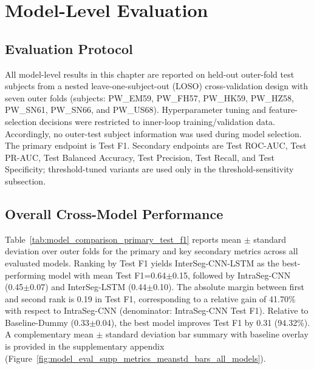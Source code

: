 \section{Model-Level Evaluation}
\label{sec:model_level_evaluation}

\setcounter{topnumber}{3}
\setcounter{bottomnumber}{1}
\setcounter{totalnumber}{4}
\renewcommand{\topfraction}{0.95}
\renewcommand{\bottomfraction}{0.80}
\renewcommand{\textfraction}{0.05}
\renewcommand{\floatpagefraction}{0.75}
\setlength{\textfloatsep}{8pt plus 2pt minus 2pt}
\setlength{\floatsep}{8pt plus 2pt minus 2pt}
\setlength{\intextsep}{8pt plus 2pt minus 2pt}

\subsection{Evaluation Protocol}
\label{sec:evaluation_protocol}
All model-level results in this chapter are reported on held-out outer-fold test subjects from a nested leave-one-subject-out (LOSO) cross-validation design with seven outer folds (subjects: PW\_EM59, PW\_FH57, PW\_HK59, PW\_HZ58, PW\_SN61, PW\_SN66, and PW\_US68). Hyperparameter tuning and feature-selection decisions were restricted to inner-loop training/validation data. Accordingly, no outer-test subject information was used during model selection. The primary endpoint is Test F1. Secondary endpoints are Test ROC-AUC, Test PR-AUC, Test Balanced Accuracy, Test Precision, Test Recall, and Test Specificity; threshold-tuned variants are used only in the threshold-sensitivity subsection.

\subsection{Overall Cross-Model Performance}
\label{sec:overall_cross_model_performance}
Table~\ref{tab:model_comparison_primary_test_f1} reports mean $\pm$ standard deviation over outer folds for the primary and key secondary metrics across all evaluated models. Ranking by Test F1 yields InterSeg-CNN-LSTM as the best-performing model with mean Test F1=0.64$\pm$0.15, followed by IntraSeg-CNN (0.45$\pm$0.07) and InterSeg-LSTM (0.44$\pm$0.10). The absolute margin between first and second rank is 0.19 in Test F1, corresponding to a relative gain of 41.70\% with respect to IntraSeg-CNN (denominator: IntraSeg-CNN Test F1). Relative to Baseline-Dummy (0.33$\pm$0.04), the best model improves Test F1 by 0.31 (94.32\%).
A complementary mean $\pm$ standard deviation bar summary with baseline overlay is provided in the supplementary appendix (Figure~\hyperref[fig:model_eval_supp_metrics_meanstd_bars_all_models]{\ref*{fig:model_eval_supp_metrics_meanstd_bars_all_models}}).

